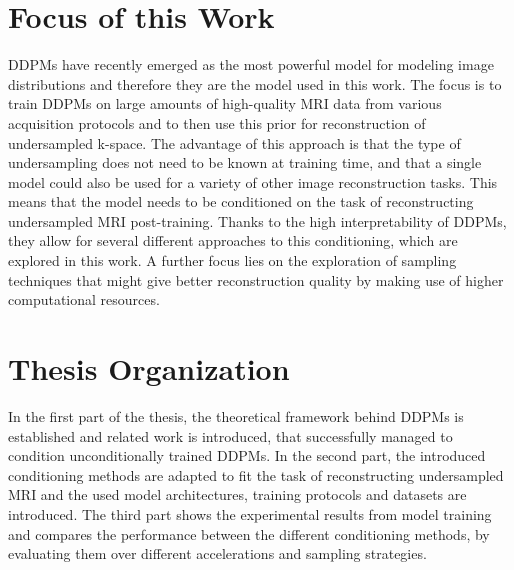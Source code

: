\section{Focus of this Work}
DDPMs have recently emerged as the most powerful model for modeling image distributions and therefore they are the model used in this work. The focus is to train DDPMs on large amounts of high-quality MRI data from various acquisition protocols and to then use this prior for reconstruction of undersampled k-space. The advantage of this approach is that the type of undersampling does not need to be known at training time, and that a single model could also be used for a variety of other image reconstruction tasks. This means that the model needs to be conditioned on the task of reconstructing undersampled MRI post-training. Thanks to the high interpretability of DDPMs, they allow for several different approaches to this conditioning, which are explored in this work. A further focus lies on the exploration of sampling techniques that might give better reconstruction quality by making use of higher computational resources.
\section{Thesis Organization}
In the first part of the thesis, the theoretical framework behind DDPMs is established and related work is introduced, that successfully managed to condition unconditionally trained DDPMs. In the second part, the introduced conditioning methods are adapted to fit the task of reconstructing undersampled MRI and the used model architectures, training protocols and datasets are introduced. The third part shows the experimental results from model training and compares the performance between the different conditioning methods, by evaluating them over different accelerations and sampling strategies.